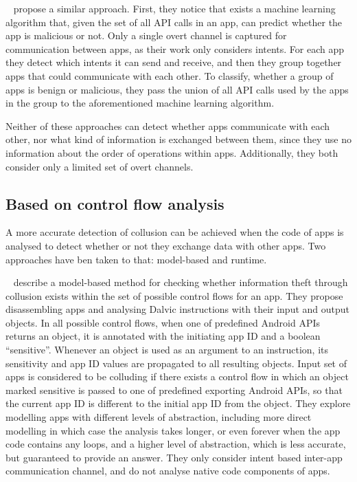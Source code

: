 \documentclass[article, oneside]{aaltoseries}
\renewcommand\gls\cgls
\begin{document}
\citeauthor{Chen2018}~\cite{Chen2018} propose a similar approach. First, they notice that exists a machine learning algorithm that, given the set of all API calls in an app, can predict whether the app is malicious or not. Only a single overt channel is captured for communication between apps, as their work only considers intents. For each app they detect which intents it can send and receive, and then they group together apps that could communicate with each other. To classify, whether a group of apps is benign or malicious, they pass the union of all API calls used by the apps in the group to the aforementioned machine learning algorithm.

Neither of these approaches can detect whether apps communicate with each other, nor what kind of information is exchanged between them, since they use no information about the order of operations within apps. Additionally, they both consider only a limited set of overt channels.

\subsection{Based on control flow analysis}
\label{sec:flow}

A more accurate detection of collusion can be achieved when the code of apps is analysed to detect whether or not they exchange data with other apps. Two approaches have ben taken to that: model-based and runtime.

\citeauthor{Asavoae2018}~\cite{Asavoae2018} describe a model-based method for checking whether information theft through collusion exists within the set of possible control flows for an app. They propose disassembling apps and analysing Dalvic \gls{vm} instructions with their input and output objects. In all possible control flows, when one of predefined Android APIs returns an object, it is annotated with the initiating app ID and a boolean ``sensitive''. Whenever an object is used as an argument to an instruction, its sensitivity and app ID values are propagated to all resulting objects. Input set of apps is considered to be colluding if there exists a control flow in which an object marked sensitive is passed to one of predefined exporting Android APIs, so that the current app ID is different to the initial app ID from the object. They explore modelling apps with different levels of abstraction, including more direct modelling in which case the analysis takes longer, or even forever when the app code contains any loops, and a higher level of abstraction, which is less accurate, but guaranteed to provide an answer. They only consider intent based inter-app communication channel, and do not analyse native code components of apps.
\end{document}
